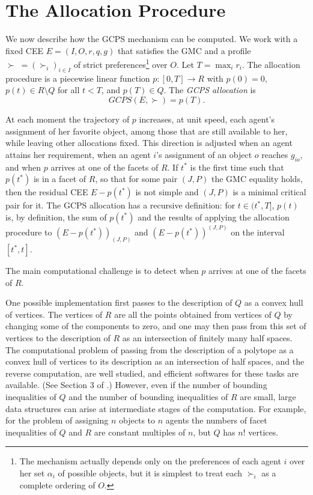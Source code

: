 \documentclass[12pt, A4paper]{article}
\theoremstyle{definition}
\begin{document}
\section{The Allocation Procedure} \label{sec:Procedure}

We now describe how the GCPS mechanism can be computed.  We work with a fixed CEE $E = (I,O,r,q,g)$ that satisfies the GMC and a profile $\succ \; = (\succ_i)_{i \in I}$ of strict preferences\footnote{The mechanism actually depends only on the preferences of each agent $i$ over her set $\alpha_i$ of possible objects, but it is simplest to treat each $\succ_i$ as a complete ordering of $O$.} over $O$.
Let $T = \max_i r_i$.  The allocation procedure is a piecewise linear function $p \colon [0,T] \to R$ with $p(0) = 0$, $p(t) \in R \setminus Q$ for all $t < T$, and $p(T) \in Q$.  The \emph{GCPS allocation} is $$GCPS(E,\succ) = p(T).$$ 

At each moment the trajectory of $p$ increases, at unit speed, each agent's assignment of her favorite object, among those that are still available to her, while leaving other allocations fixed.  This direction is adjusted when an agent attains her requirement, when an agent $i$'s assignment of an object $o$ reaches $g_{io}$, and  when $p$ arrives at one of the facets of $R$.  If $t^*$ is the first time such that $p(t^*)$ is in a facet of $R$, so that for some pair $(J,P)$ the GMC equality holds, then
the residual CEE $E - p(t^*)$ is not simple and $(J,P)$ is a minimal critical pair for it.  The GCPS allocation has a recursive definition: for $t \in (t^*,T]$, $p(t)$ is, by definition, the sum of $p(t^*)$ and the results of applying the allocation procedure to $(E - p(t^*))_{(J,P)}$ and $(E - p(t^*))^{(J,P)}$ on the interval $[t^*,t]$.  

The main computational challenge is to detect  when $p$ arrives at one of the facets of $R$.  

One possible implementation first passes to the description of $Q$ as a convex hull of vertices.  The vertices of $R$ are all the points obtained from vertices of $Q$ by changing some of the components to zero, and one may then pass from this set of vertices to the description of $R$ as an intersection of finitely many half spaces.  The computational problem of passing from the description of a polytope as a convex hull of vertices to its description as an intersection of half spaces, and the reverse computation, are well studied, and efficient softwares for these tasks are available.  (See Section 3 of \cite{balbuzanov22jet}.)  However, even if the number of bounding inequalities of $Q$ and the number of bounding inequalities of $R$ are small, large data structures can arise at intermediate stages of the computation.  For example, for the problem of assigning $n$ objects to $n$ agents the numbers of facet inequalities of $Q$ and $R$ are constant multiples of $n$, but $Q$ has $n!$ vertices.
\end{document}
